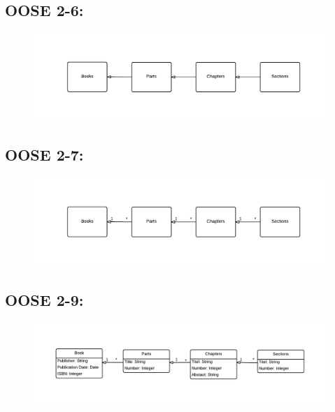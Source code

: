 \documentclass[11pt,a4paper]{report}
\begin{document}
\subsection{OOSE 2-6:}

\begin{figure}[h!]
    \centering
    \includegraphics[width=1.1\textwidth]{pictures/oose2_6}
    \label{fig:OOSE26}
\end{figure}

\subsection{OOSE 2-7:}
\begin{figure}[h!]
    \centering
    \includegraphics[width=1.1\textwidth]{pictures/oose2_7}

    \label{fig:OOSE27}
\end{figure}


\newpage
\subsection{OOSE 2-9:}

\begin{figure}[h!]
    \centering
    \includegraphics[width=1.1\textwidth]{pictures/oose2_9}

    \label{fig:OOSE29}
\end{figure}
\end{document}
